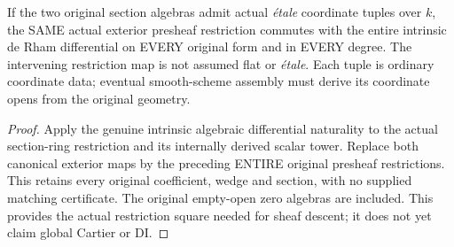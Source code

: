 \begin{theorem}
\label{thm:cartier-original-section-differential-restriction}
\leanok
If the two original section algebras admit actual \emph{\'etale}
coordinate tuples over $k$, the SAME actual exterior presheaf
restriction commutes with the entire intrinsic de Rham differential
on EVERY original form and in EVERY degree. The intervening
restriction map is not assumed flat or \emph{\'etale}. Each tuple
is ordinary coordinate data; eventual smooth-scheme assembly
must derive its coordinate opens from the original geometry.
\end{theorem}
\begin{proof}
Apply the genuine intrinsic algebraic differential naturality to
the actual section-ring restriction and its internally derived
scalar tower. Replace both canonical exterior maps by the
preceding ENTIRE original presheaf restrictions. This retains
every original coefficient, wedge and section, with no supplied
matching certificate. The original empty-open zero algebras are
included. This provides the actual restriction square needed
for sheaf descent; it does not yet claim global Cartier or DI.
\end{proof}
